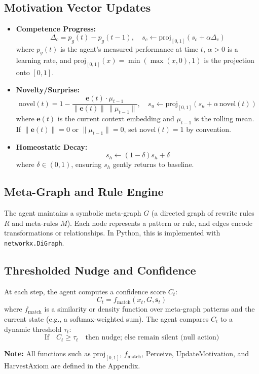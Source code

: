 \documentclass[11pt]{article}
\begin{document}
\subsection{Motivation Vector Updates}
\begin{itemize}
  \item \textbf{Competence Progress:}
  \[
    \Delta_c = p_g(t) - p_g(t-1), \quad s_c \leftarrow \mathrm{proj}_{[0,1]}(s_c + \alpha \Delta_c)
  \]
  where $p_g(t)$ is the agent's measured performance at time $t$, $\alpha > 0$ is a learning rate, and $\mathrm{proj}_{[0,1]}(x) = \min(\max(x, 0), 1)$ is the projection onto $[0,1]$.
  \item \textbf{Novelty/Surprise:}
  \[
    \mathrm{novel}(t) = 1 - \frac{\mathbf{e}(t) \cdot \mu_{t-1}}{\|\mathbf{e}(t)\|\,\|\mu_{t-1}\|}, \quad s_u \leftarrow \mathrm{proj}_{[0,1]}(s_u + \alpha\,\mathrm{novel}(t))
  \]
  where $\mathbf{e}(t)$ is the current context embedding and $\mu_{t-1}$ is the rolling mean. If $\|\mathbf{e}(t)\|=0$ or $\|\mu_{t-1}\|=0$, set $\mathrm{novel}(t) = 1$ by convention.
  \item \textbf{Homeostatic Decay:}
  \[
    s_h \leftarrow (1-\delta)s_h + \delta
  \]
  where $\delta \in (0,1)$, ensuring $s_h$ gently returns to baseline.
\end{itemize}

\subsection{Meta-Graph and Rule Engine}
The agent maintains a symbolic meta-graph $G$ (a directed graph of rewrite rules $R$ and meta-rules $M$). Each node represents a pattern or rule, and edges encode transformations or relationships. In Python, this is implemented with \texttt{networkx.DiGraph}.

\subsection{Thresholded Nudge and Confidence}
At each step, the agent computes a confidence score $C_t$:
\[
  C_t = f_\mathrm{match}(x_t, G, \mathbf{s}_t)
\]
where $f_\mathrm{match}$ is a similarity or density function over meta-graph patterns and the current state (e.g., a softmax-weighted sum). The agent compares $C_t$ to a dynamic threshold $\tau_t$:
\[
  \text{If}\quad C_t \geq \tau_t\quad \text{then nudge; else remain silent (null action)}
\]

\textbf{Note:} All functions such as $\mathrm{proj}_{[0,1]}$, $f_\mathrm{match}$, $\mathrm{Perceive}$, $\mathrm{UpdateMotivation}$, and $\mathrm{HarvestAxiom}$ are defined in the Appendix.
\end{document}

